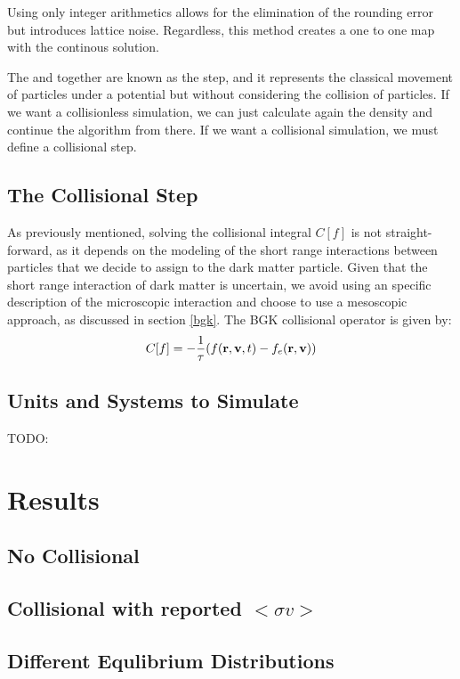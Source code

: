 Using only integer arithmetics allows for the elimination of the rounding error but introduces lattice noise. Regardless, this method creates a one to one map with the continous solution.\cite{franco} \cite{integerLatticeDynamics}

The  and  together are known as the  step, and it represents the classical movement of particles under a potential but without considering the collision of particles. If we want a collisionless simulation, we can just calculate again the density and continue the algorithm from there. If we want a collisional simulation, we must define a collisional step.

\section{The Collisional Step}
As previously mentioned, solving the collisional integral $C[f]$ is not straight-forward, as it depends on the modeling of the short range interactions between particles that we decide to assign to the dark matter particle. Given that the short range interaction of dark matter is uncertain, we avoid using an specific description of the microscopic interaction and choose to use a mesoscopic approach, as discussed in section \ref{bgk}. The BGK collisional operator is given by:\\
\begin{equation}
C[f] = -\frac{1}{\tau}(\f - f_e(\rv))
\end{equation}

\section{Units and Systems to Simulate}
TODO:



















\chapter{Results}
\section{No Collisional}
\section{Collisional with reported $<\sigma v>$}
\section{Different Equlibrium Distributions}
